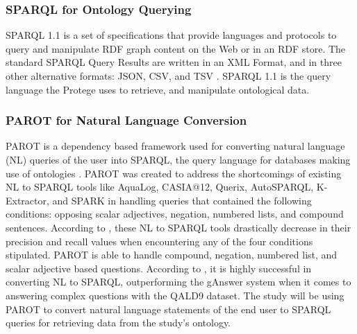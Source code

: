 \subsubsection{SPARQL for Ontology Querying}
SPARQL 1.1 is a set of specifications that provide languages and protocols to query and manipulate RDF graph content on the Web or in an RDF store. The standard SPARQL Query Results are written in an XML Format, and in three other alternative formats: JSON, CSV, and TSV \cite{picalausa2011real}. SPARQL 1.1 is the query language the Protege uses to retrieve, and manipulate ontological data.
\subsubsection{PAROT for Natural Language Conversion}
PAROT is a dependency based framework used for converting natural language (NL) queries of the user into SPARQL, the query language for databases making use of ontologies \cite{ochieng2020parot}. PAROT was created to address the shortcomings of existing NL to SPARQL tools like AquaLog, CASIA@12, Querix, AutoSPARQL, K-Extractor, and SPARK in handling queries that contained the following conditions: opposing scalar adjectives, negation, numbered lists, and compound sentences. According to , these NL to SPARQL tools drastically decrease in their precision and recall values when encountering any of the four conditions stipulated. PAROT is able to handle compound, negation, numbered list, and scalar adjective based questions. According to , it is highly successful in converting NL to SPARQL, outperforming the gAnswer system when it comes to answering complex questions with the QALD9 dataset. The study will be using PAROT to convert natural language statements of the end user to SPARQL queries for retrieving data from the study's ontology.